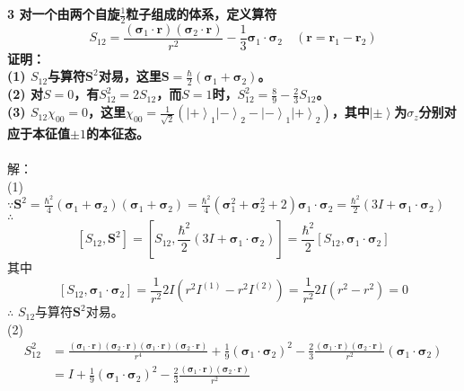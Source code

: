 \documentclass[12pt]{article}
\numberwithin{equation}{section}	 %
\begin{document}
\begin{spacing}{1.5}
\textbf{3 \quad 对一个由两个自旋$\displaystyle \frac{1}{2}$粒子组成的体系，定义算符
\begin{equation}\nonumber 		%
S_{12}=\frac{(\bm\sigma_{1}\cdot\bm{r})(\bm\sigma_{2}\cdot\bm{r})}{r^{2}}-\frac{1}{3}\bm\sigma_{1}\cdot\bm\sigma_{2} \quad (\bm{r}=\bm{r}_{1}-\bm{r}_{2})
\end{equation}
证明：\\
(1) $S_{12}$与算符$\bm{S}^{2}$对易，这里$\displaystyle \bm{S}=\frac{\hbar}{2}\left( \bm\sigma_{1}+\bm\sigma_{2} \right)$。\\
(2) 对$S=0$，有$S_{12}^{2}=2S_{12}$，而$S=1$时，$\displaystyle S_{12}^{2}=\frac{8}{9}-\frac{2}{3}S_{12}$。\\
(3) $S_{12}\chi_{00}=0$，这里$\displaystyle \chi_{00} = \frac{1}{\sqrt{2}}\left( \left|+\right>_{1}\left|-\right>_{2} - \left|-\right>_{1}\left|+\right>_{2} \right)$，其中$\left|\pm\right>$为$\sigma_{z}$分别对应于本征值$\pm1$的本征态。} \\
~\\
解：\\
(1) $\because \displaystyle \bm{S}^{2} = \frac{\hbar^{2}}{4}\left(\bm\sigma_{1}+\bm\sigma_{2}\right)\left(\bm\sigma_{1}+\bm\sigma_{2}\right) = \frac{\hbar^{2}}{4} \left(\bm\sigma_{1}^{2}+\bm\sigma_{2}^{2}+2\right)\bm\sigma_{1}\cdot\bm\sigma_{2} = \frac{\hbar^{2}}{2}\left(3I+\bm\sigma_{1}\cdot\bm\sigma_{2}\right)$\\
$\therefore$ 
\begin{equation}
\left[ S_{12}, \bm{S}^{2}\right] = \left[ S_{12}, \frac{\hbar^{2}}{2}\left(3I+\bm\sigma_{1}\cdot\bm\sigma_{2}\right) \right] = \frac{\hbar^{2}}{2}\left[ S_{12}, \bm\sigma_{1}\cdot\bm\sigma_{2}\right]
\end{equation}
其中
\begin{equation}
\left[ S_{12}, \bm\sigma_{1}\cdot\bm\sigma_{2}\right] = \frac{1}{r^{2}}2I\left(r^{2}I^{(1)} - r^{2}I^{(2)}\right) = \frac{1}{r^{2}}2I\left(r^{2}- r^{2}\right)=0
\end{equation}
$\therefore$ $S_{12}$与算符$\bm{S}^{2}$对易。\\
(2) \begin{align*}
S_{12}^{2} &=\frac{(\bm\sigma_{1}\cdot\bm{r})(\bm\sigma_{2}\cdot\bm{r})(\bm\sigma_{1}\cdot\bm{r})(\bm\sigma_{2}\cdot\bm{r})}{r^{4}} + \frac{1}{9}\left(\bm\sigma_{1}\cdot\bm\sigma_{2}\right)^{2} - \frac{2}{3}\frac{(\bm\sigma_{1}\cdot\bm{r})(\bm\sigma_{2}\cdot\bm{r})}{r^{2}}\left(\bm\sigma_{1}\cdot\bm\sigma_{2}\right) \\
&= I + \frac{1}{9}\left(\bm\sigma_{1}\cdot\bm\sigma_{2}\right)^{2} -\frac{2}{3}\frac{(\bm\sigma_{1}\cdot\bm{r})(\bm\sigma_{2}\cdot\bm{r})}{r^{2}}

\end{align*}
\end{spacing}
\end{document}

